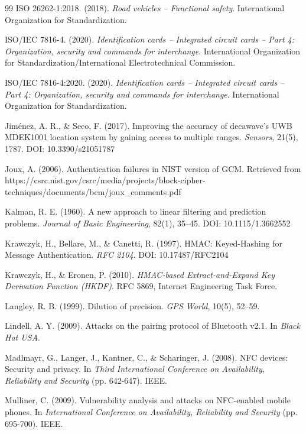 \begin{thebibliography}{99}
ISO 26262-1:2018. (2018). \textit{Road vehicles -- Functional safety}. International Organization for Standardization.

ISO/IEC 7816-4. (2020). \textit{Identification cards -- Integrated circuit cards -- Part 4: Organization, security and commands for interchange}. International Organization for Standardization/International Electrotechnical Commission.

ISO/IEC 7816-4:2020. (2020). \textit{Identification cards -- Integrated circuit cards -- Part 4: Organization, security and commands for interchange}. International Organization for Standardization.

Jiménez, A. R., \& Seco, F. (2017). Improving the accuracy of decawave's UWB MDEK1001 location system by gaining access to multiple ranges. \textit{Sensors}, 21(5), 1787. DOI: 10.3390/s21051787

Joux, A. (2006). Authentication failures in NIST version of GCM. Retrieved from https://csrc.nist.gov/csrc/media/projects/block-cipher-techniques/documents/bcm/joux\_comments.pdf

Kalman, R. E. (1960). A new approach to linear filtering and prediction problems. \textit{Journal of Basic Engineering}, 82(1), 35--45. DOI: 10.1115/1.3662552

Krawczyk, H., Bellare, M., \& Canetti, R. (1997). HMAC: Keyed-Hashing for Message Authentication. \textit{RFC 2104}. DOI: 10.17487/RFC2104

Krawczyk, H., \& Eronen, P. (2010). \textit{HMAC-based Extract-and-Expand Key Derivation Function (HKDF)}. RFC 5869, Internet Engineering Task Force.

Langley, R. B. (1999). Dilution of precision. \textit{GPS World}, 10(5), 52--59.

Lindell, A. Y. (2009). Attacks on the pairing protocol of Bluetooth v2.1. In \textit{Black Hat USA}.

Madlmayr, G., Langer, J., Kantner, C., \& Scharinger, J. (2008). NFC devices: Security and privacy. In \textit{Third International Conference on Availability, Reliability and Security} (pp. 642-647). IEEE.

Mulliner, C. (2009). Vulnerability analysis and attacks on NFC-enabled mobile phones. In \textit{International Conference on Availability, Reliability and Security} (pp. 695-700). IEEE.


\end{thebibliography}
